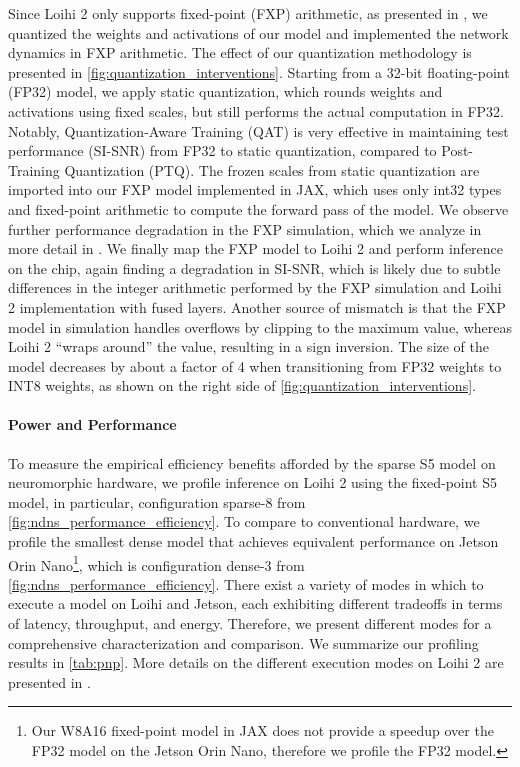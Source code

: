 Since Loihi 2 only supports fixed-point (FXP) arithmetic, as presented in , we quantized the weights and activations of our model and implemented the network dynamics in FXP arithmetic. The effect of our quantization methodology is presented in \autoref{fig:quantization_interventions}.
%
Starting from a 32-bit floating-point (FP32) model, we apply static quantization, which rounds weights and activations using fixed scales, but still performs the actual computation in FP32. Notably, Quantization-Aware Training (QAT) is very effective in maintaining test performance (SI-SNR) from FP32 to static quantization, compared to Post-Training Quantization (PTQ).
%
The frozen scales from static quantization are imported into our FXP model implemented in JAX, which uses only int32 types and fixed-point arithmetic to compute the forward pass of the model.
We observe further performance degradation in the FXP simulation, which we analyze in more detail in . 
%
We finally map the FXP model to Loihi 2 and perform inference on the chip, again finding a degradation in SI-SNR, which is likely due to subtle differences in the integer arithmetic performed by the FXP simulation and Loihi 2 implementation with fused layers. Another source of mismatch is that the FXP model in simulation handles overflows by clipping to the maximum value, whereas Loihi 2 ``wraps around'' the value, resulting in a sign inversion.
%
The size of the model decreases by about a factor of 4 when transitioning from FP32 weights to INT8 weights, as shown on the right side of \autoref{fig:quantization_interventions}.



\paragraph{Power and Performance}



To measure the empirical efficiency benefits afforded by the sparse S5 model on neuromorphic hardware, we profile inference on Loihi 2 using the fixed-point S5 model, in particular, configuration sparse-\qty{8}{} from \autoref{fig:ndns_performance_efficiency}.
%
To compare to conventional hardware, we profile the smallest dense model that achieves equivalent performance on Jetson Orin Nano\footnote{Our W8A16 fixed-point model in JAX does not provide a speedup over the FP32 model on the Jetson Orin Nano, therefore we profile the FP32 model.}, which is configuration dense-\qty{3}{} from \autoref{fig:ndns_performance_efficiency}.
%
There exist a variety of modes in which to execute a model on Loihi and Jetson, each exhibiting different tradeoffs in terms of latency, throughput, and energy.
Therefore, we present different modes for a comprehensive characterization and comparison.
We summarize our profiling results in \autoref{tab:pnp}. More details on the different execution modes on Loihi 2 are presented in .

